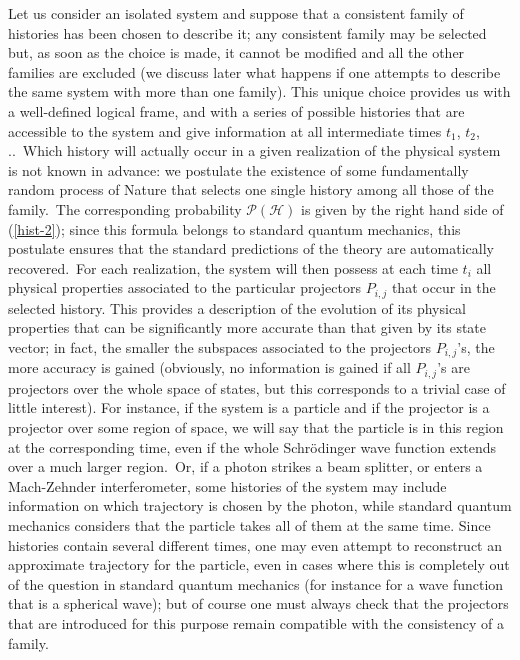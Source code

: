 \documentclass[12pt,onecolumn]{article}%
\begin{document}
Let us consider an isolated system and suppose that a consistent family of
histories has been chosen to describe it; any consistent family may be
selected but, as soon as the choice is made, it cannot be modified and all the
other families are excluded (we discuss later what happens if one attempts to
describe the same system with more than one family). This unique choice
provides us with a well-defined logical frame, and with a series of possible
histories that are accessible to the system and give information at all
intermediate times $t_{1}$, $t_{2}$, ..\ Which history will actually occur in
a given realization of the physical system is not known in advance: we
postulate the existence of some fundamentally random process of Nature that
selects one single history among all those of the family.\ The corresponding
probability $\mathcal{P}(\mathcal{H})$ is given by the right hand side of
(\ref{hist-2}); since this formula belongs to standard quantum mechanics, this
postulate ensures that the standard predictions of the theory are
automatically recovered.\ For each realization, the system will then possess
at each time $t_{i}$ all physical properties associated to the particular
projectors $P_{i,j}$ that occur in the selected history. This provides a
description of the evolution of its physical properties that can be
significantly more accurate than that given by its state vector; in fact, the
smaller the subspaces associated to the projectors $P_{i,j}$'s, the more
accuracy is gained (obviously, no information is gained if all $P_{i,j}$'s are
projectors over the whole space of states, but this corresponds to a trivial
case of little interest). For instance, if the system is a particle and if the
projector is a projector over some region of space, we will say that the
particle is in this region at the corresponding time, even if the whole
Schr\"{o}dinger wave function extends over a much larger region.\ Or, if a
photon strikes a beam splitter, or enters a Mach-Zehnder interferometer, some
histories of the system may include information on which trajectory is chosen
by the photon, while standard quantum mechanics considers that the particle
takes all of them at the same time. Since histories contain several different
times, one may even attempt to reconstruct an approximate trajectory for the
particle, even in cases where this is completely out of the question in
standard quantum mechanics (for instance for a wave function that is a
spherical wave); but of course one must always check that the projectors that
are introduced for this purpose remain compatible with the consistency of a family.
\end{document}

